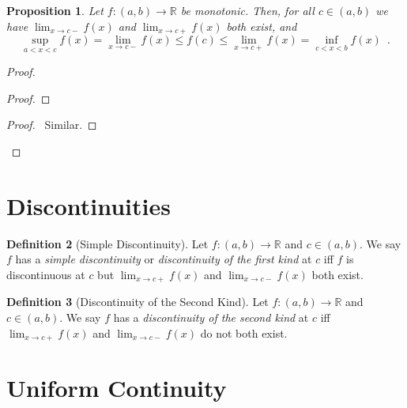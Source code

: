 \documentclass{book}
\let\qed\relax
\newtheorem{prop}{Proposition}[chapter]
\theoremstyle{definition}
\newtheorem{df}[prop]{Definition}
\begin{document}
\begin{prop}
Let $f : (a,b) \rightarrow \mathbb{R}$ be monotonic. Then, for all $c \in (a,b)$ we have $\lim_{x \rightarrow c-} f(x)$ and $\lim_{x \rightarrow c+}f(x)$ both exist, and
\[ \sup_{a < x < c} f(x) = \lim_{x \rightarrow c-}f(x) \leq f(c) \leq \lim_{x \rightarrow c+} f(x) = \inf_{c < x < b} f(x) \enspace . \]
\end{prop}

\begin{proof}
\pf
{}
\begin{proof}
\end{proof}
\begin{proof}
	\pf\ Similar.
\end{proof}
\qed
\end{proof}

\section{Discontinuities}

\begin{df}[Simple Discontinuity]
Let $f : (a,b) \rightarrow \mathbb{R}$ and $c \in (a,b)$. We say $f$ has a \emph{simple discontinuity} or \emph{discontinuity of the first kind} at $c$ iff $f$ is discontinuous at $c$ but $\lim_{x \rightarrow c+} f(x)$ and $\lim_{x \rightarrow c-} f(x)$ both exist.
\end{df}

\begin{df}[Discontinuity of the Second Kind]
Let $f : (a,b) \rightarrow \mathbb{R}$ and $c \in (a,b)$. We say $f$ has a \emph{discontinuity of the second kind} at $c$ iff  $\lim_{x \rightarrow c+} f(x)$ and $\lim_{x \rightarrow c-} f(x)$ do not both exist.
\end{df}

\section{Uniform Continuity}
\end{document}
